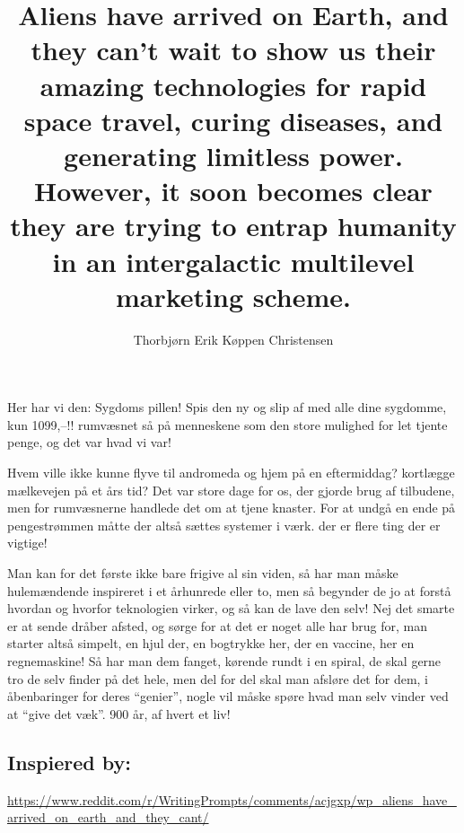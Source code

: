 \documentclass[oneside,danish,onecolumn,openbib,a4paper]{memoir}
\title{Aliens have arrived on Earth, and they can't wait to show us their amazing technologies for rapid space travel, curing diseases, and generating limitless power. However, it soon becomes clear they are trying to entrap humanity in an intergalactic multilevel marketing scheme.}
\author{Thorbjørn Erik Køppen Christensen}
\begin{document}
\maketitle{}
Her har vi den: Sygdoms pillen! Spis den ny og slip af med alle dine sygdomme, kun 1099,--!! rumvæsnet så på menneskene som den store mulighed for let tjente penge, og det var hvad vi var!

Hvem ville ikke kunne flyve til andromeda og hjem på en eftermiddag? kortlægge mælkevejen på et års tid? Det var store dage for os, der gjorde brug af tilbudene, men for rumvæsnerne handlede det om at tjene knaster.
For at undgå en ende på pengestrømmen måtte der altså sættes systemer i værk. der er flere ting der er vigtige!

Man kan for det første ikke bare frigive al sin viden, så har man måske hulemændende inspireret i et århunrede eller to, men så begynder de jo at forstå hvordan og hvorfor teknologien virker, og så kan de lave den selv! Nej det smarte er at sende dråber afsted, og sørge for at det er noget alle har brug for, man starter altså simpelt, en hjul der, en bogtrykke her, der en vaccine, her en regnemaskine!
Så har man dem fanget, kørende rundt i en spiral, de skal gerne tro de selv finder på det hele, men del for del skal man afsløre det for dem, i åbenbaringer for deres ``genier'', nogle vil måske spøre hvad man selv vinder ved at ``give det væk''.
900 år, af hvert et liv!
\subsection{Inspiered by:}
\url{https://www.reddit.com/r/WritingPrompts/comments/acjgxp/wp_aliens_have_arrived_on_earth_and_they_cant/}
\end{document}
